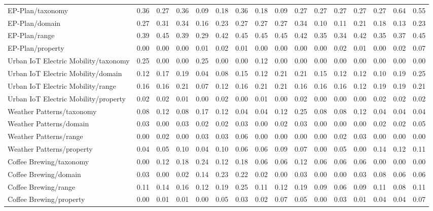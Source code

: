 \begin{tabular}{lccccccccccccccc}
EP-Plan/taxonomy & 0.36 & 0.27 & 0.36 & 0.09 & 0.18 & 0.36 & 0.18 & 0.09 & 0.27 & 0.27 & 0.27 & 0.27 & 0.27 & 0.64 & 0.55 \\
EP-Plan/domain & 0.27 & 0.31 & 0.34 & 0.16 & 0.23 & 0.27 & 0.27 & 0.27 & 0.34 & 0.10 & 0.11 & 0.21 & 0.18 & 0.13 & 0.23 \\
EP-Plan/range & 0.39 & 0.45 & 0.39 & 0.29 & 0.42 & 0.45 & 0.45 & 0.45 & 0.42 & 0.35 & 0.34 & 0.42 & 0.35 & 0.37 & 0.45 \\
EP-Plan/property & 0.00 & 0.00 & 0.00 & 0.01 & 0.02 & 0.01 & 0.00 & 0.00 & 0.00 & 0.00 & 0.02 & 0.01 & 0.00 & 0.02 & 0.07 \\
Urban IoT Electric Mobility/taxonomy & 0.25 & 0.00 & 0.00 & 0.25 & 0.00 & 0.00 & 0.12 & 0.00 & 0.00 & 0.00 & 0.00 & 0.00 & 0.00 & 0.00 & 0.00 \\
Urban IoT Electric Mobility/domain & 0.12 & 0.17 & 0.19 & 0.04 & 0.08 & 0.15 & 0.12 & 0.21 & 0.21 & 0.15 & 0.12 & 0.12 & 0.10 & 0.19 & 0.25 \\
Urban IoT Electric Mobility/range & 0.16 & 0.16 & 0.21 & 0.07 & 0.12 & 0.16 & 0.21 & 0.21 & 0.16 & 0.16 & 0.16 & 0.12 & 0.19 & 0.19 & 0.21 \\
Urban IoT Electric Mobility/property & 0.02 & 0.02 & 0.01 & 0.00 & 0.02 & 0.00 & 0.01 & 0.00 & 0.02 & 0.00 & 0.00 & 0.00 & 0.02 & 0.02 & 0.02 \\
Weather Patterns/taxonomy & 0.08 & 0.12 & 0.08 & 0.17 & 0.12 & 0.04 & 0.04 & 0.12 & 0.25 & 0.08 & 0.08 & 0.12 & 0.04 & 0.04 & 0.04 \\
Weather Patterns/domain & 0.03 & 0.00 & 0.03 & 0.02 & 0.02 & 0.03 & 0.00 & 0.02 & 0.03 & 0.00 & 0.00 & 0.00 & 0.02 & 0.02 & 0.05 \\
Weather Patterns/range & 0.00 & 0.02 & 0.00 & 0.03 & 0.03 & 0.06 & 0.00 & 0.00 & 0.00 & 0.00 & 0.02 & 0.03 & 0.00 & 0.00 & 0.00 \\
Weather Patterns/property & 0.04 & 0.05 & 0.10 & 0.04 & 0.10 & 0.06 & 0.06 & 0.09 & 0.07 & 0.00 & 0.05 & 0.00 & 0.14 & 0.12 & 0.11 \\
Coffee Brewing/taxonomy & 0.00 & 0.12 & 0.18 & 0.24 & 0.12 & 0.18 & 0.06 & 0.06 & 0.12 & 0.06 & 0.06 & 0.06 & 0.00 & 0.00 & 0.00 \\
Coffee Brewing/domain & 0.03 & 0.00 & 0.02 & 0.14 & 0.23 & 0.22 & 0.02 & 0.00 & 0.03 & 0.00 & 0.00 & 0.03 & 0.08 & 0.06 & 0.06 \\
Coffee Brewing/range & 0.11 & 0.14 & 0.16 & 0.12 & 0.19 & 0.25 & 0.11 & 0.12 & 0.19 & 0.09 & 0.06 & 0.09 & 0.11 & 0.08 & 0.11 \\
Coffee Brewing/property & 0.00 & 0.01 & 0.01 & 0.00 & 0.05 & 0.03 & 0.02 & 0.07 & 0.05 & 0.00 & 0.03 & 0.01 & 0.04 & 0.04 & 0.07 \\

\end{tabular}
